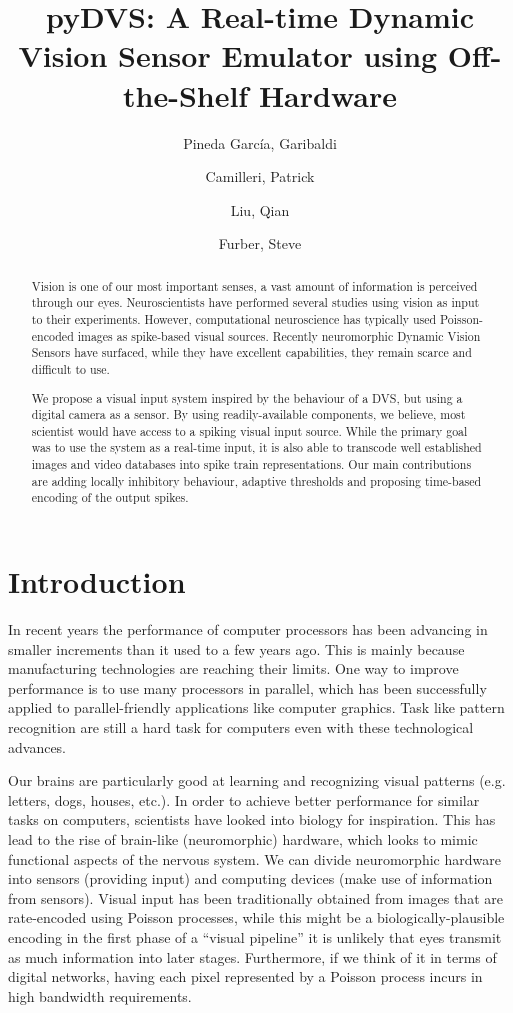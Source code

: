 \documentclass[twocolumn]{article}
\title{pyDVS: A Real-time Dynamic Vision Sensor Emulator using Off-the-Shelf Hardware}
\author{Pineda García, Garibaldi \and Camilleri, Patrick \and Liu, Qian \and Furber, Steve}
\begin{document}
\maketitle
\begin{abstract}
\textsf{Vision is one of our most important senses, a vast amount of information is perceived through our eyes. Neuroscientists have performed several studies using vision as input to their experiments. However, computational neuroscience has typically used Poisson-encoded images as spike-based visual sources. Recently neuromorphic Dynamic Vision Sensors have surfaced, while they have excellent capabilities, they remain scarce and difficult to use.}


\textsf{
We propose a visual input system inspired by the behaviour of a DVS, but using a digital camera as a sensor. By using readily-available components, we believe, most scientist would have access to a spiking visual input source. While the primary goal was to use the system as a real-time input, it is also able to transcode well established images and video databases into spike train representations. Our main contributions are adding locally inhibitory behaviour, adaptive thresholds and proposing time-based encoding of the output spikes.}

\end{abstract}

\section{Introduction}

In recent years the performance of computer processors has been advancing in smaller increments than it used to a few years ago. This is mainly because manufacturing technologies are reaching their limits. One way to improve performance is to use many processors in parallel, which has been successfully applied to parallel-friendly applications like computer graphics. Task like pattern recognition are still a hard task for computers even with these technological advances.

Our brains are particularly good at learning and recognizing visual patterns (e.g. letters, dogs, houses, etc.). In order to achieve better performance for similar tasks on computers, scientists have looked into biology for inspiration. This has lead to the rise of brain-like (neuromorphic) hardware, which looks to mimic functional aspects of the nervous system. We can divide neuromorphic hardware into sensors (providing input) and computing devices (make use of information from sensors). Visual input has been traditionally obtained from images that are rate-encoded using Poisson processes, while this might be a biologically-plausible encoding in the first phase of a ``visual pipeline'' it is unlikely that eyes transmit as much information into later stages. Furthermore, if we think of it in terms of digital networks, having each pixel represented by a Poisson process incurs in high bandwidth requirements. 
\end{document}
